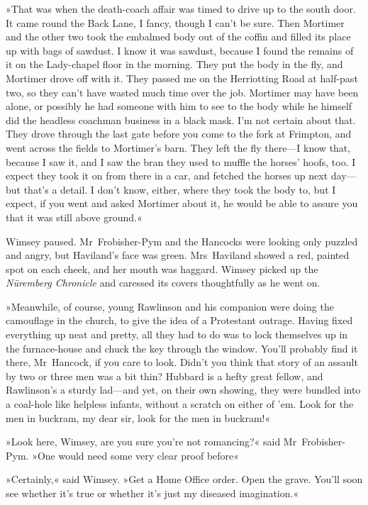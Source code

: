 »That was when the death-coach affair was timed to drive up to the south door. It came round the Back Lane, I fancy, though I can't be sure. Then Mortimer and the other two took the embalmed body out of the coffin and filled its place up with bags of sawdust. I know it was sawdust, because I found the remains of it on the Lady-chapel floor in the morning. They put the body in the fly, and Mortimer drove off with it. They passed me on the Herriotting Road at half-past two, so they can't have wasted much time over the job. Mortimer may have been alone, or possibly he had someone with him to see to the body while he himself did the headless coachman business in a black mask. I'm not certain about that. They drove through the last gate before you come to the fork at Frimpton, and went across the fields to Mortimer's barn. They left the fly there—I know that, because I saw it, and I saw the bran they used to muffle the horses' hoofs, too. I expect they took it on from there in a car, and fetched the horses up next day—but that's a detail. I don't know, either, where they took the body to, but I expect, if you went and asked Mortimer about it, he would be able to assure you that it was still above ground.«

Wimsey paused. Mr~Frobisher-Pym and the Hancocks were looking only puzzled and angry, but Haviland's face was green. Mrs~Haviland showed a red, painted spot on each cheek, and her mouth was haggard. Wimsey picked up the \textit{Nüremberg Chronicle} and caressed its covers thoughtfully as he went on.

»Meanwhile, of course, young Rawlinson and his companion were doing the camouflage in the church, to give the idea of a Protestant outrage. Having fixed everything up neat and pretty, all they had to do was to lock themselves up in the furnace-house and chuck the key through the window. You'll probably find it there, Mr~Hancock, if you care to look. Didn't you think that story of an assault by two or three men was a bit thin? Hubbard is a hefty great fellow, and Rawlinson's a sturdy lad—and yet, on their own showing, they were bundled into a coal-hole like helpless infants, without a scratch on either of 'em. Look for the men in buckram, my dear sir, look for the men in buckram!«

»Look here, Wimsey, are you sure you're not romancing?« said Mr~Frobisher-Pym. »One would need some very clear proof before\longdash«

»Certainly,« said Wimsey. »Get a Home Office order. Open the grave. You'll soon see whether it's true or whether it's just my diseased imagination.«


